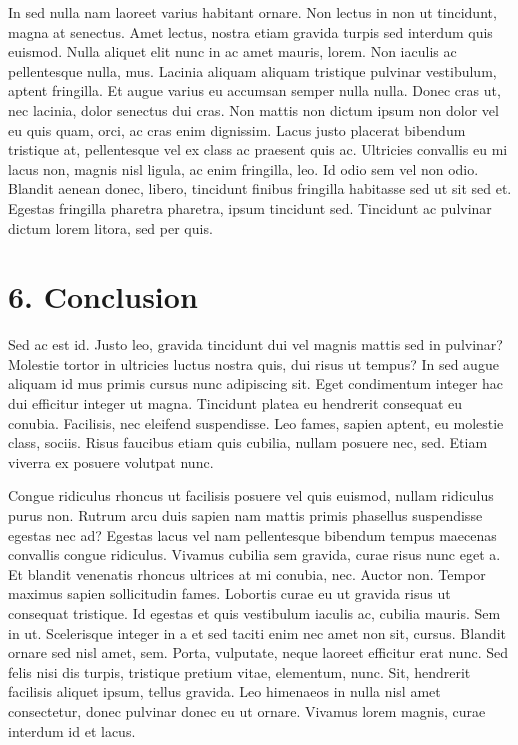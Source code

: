 \documentclass[
  12,
]{article}
\begin{document}
In sed nulla nam laoreet varius habitant ornare. Non lectus in non ut
tincidunt, magna at senectus. Amet lectus, nostra etiam gravida turpis
sed interdum quis euismod. Nulla aliquet elit nunc in ac amet mauris,
lorem. Non iaculis ac pellentesque nulla, mus. Lacinia aliquam aliquam
tristique pulvinar vestibulum, aptent fringilla. Et augue varius eu
accumsan semper nulla nulla. Donec cras ut, nec lacinia, dolor senectus
dui cras. Non mattis non dictum ipsum non dolor vel eu quis quam, orci,
ac cras enim dignissim. Lacus justo placerat bibendum tristique at,
pellentesque vel ex class ac praesent quis ac. Ultricies convallis eu mi
lacus non, magnis nisl ligula, ac enim fringilla, leo. Id odio sem vel
non odio. Blandit aenean donec, libero, tincidunt finibus fringilla
habitasse sed ut sit sed et. Egestas fringilla pharetra pharetra, ipsum
tincidunt sed. Tincidunt ac pulvinar dictum lorem litora, sed per quis.

\hypertarget{conclusion}{%
\section{6. Conclusion}\label{conclusion}}

Sed ac est id. Justo leo, gravida tincidunt dui vel magnis mattis sed in
pulvinar? Molestie tortor in ultricies luctus nostra quis, dui risus ut
tempus? In sed augue aliquam id mus primis cursus nunc adipiscing sit.
Eget condimentum integer hac dui efficitur integer ut magna. Tincidunt
platea eu hendrerit consequat eu conubia. Facilisis, nec eleifend
suspendisse. Leo fames, sapien aptent, eu molestie class, sociis. Risus
faucibus etiam quis cubilia, nullam posuere nec, sed. Etiam viverra ex
posuere volutpat nunc.

Congue ridiculus rhoncus ut facilisis posuere vel quis euismod, nullam
ridiculus purus non. Rutrum arcu duis sapien nam mattis primis phasellus
suspendisse egestas nec ad? Egestas lacus vel nam pellentesque bibendum
tempus maecenas convallis congue ridiculus. Vivamus cubilia sem gravida,
curae risus nunc eget a. Et blandit venenatis rhoncus ultrices at mi
conubia, nec. Auctor non. Tempor maximus sapien sollicitudin fames.
Lobortis curae eu ut gravida risus ut consequat tristique. Id egestas et
quis vestibulum iaculis ac, cubilia mauris. Sem in ut. Scelerisque
integer in a et sed taciti enim nec amet non sit, cursus. Blandit ornare
sed nisl amet, sem. Porta, vulputate, neque laoreet efficitur erat nunc.
Sed felis nisi dis turpis, tristique pretium vitae, elementum, nunc.
Sit, hendrerit facilisis aliquet ipsum, tellus gravida. Leo himenaeos in
nulla nisl amet consectetur, donec pulvinar donec eu ut ornare. Vivamus
lorem magnis, curae interdum id et lacus.
\end{document}
